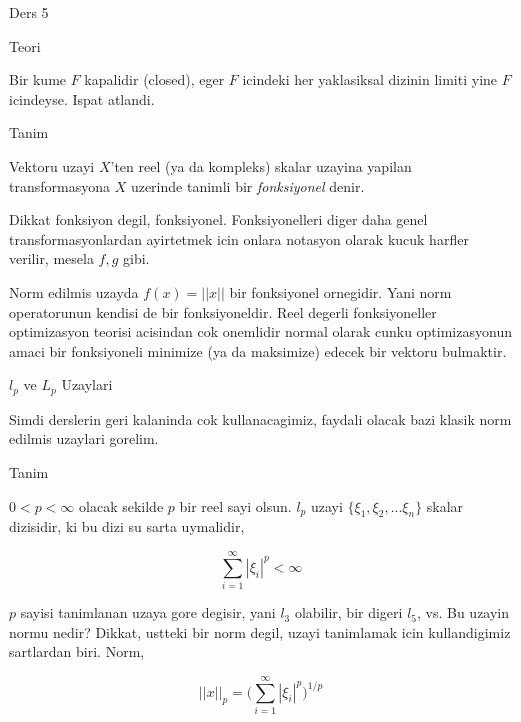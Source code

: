 \documentclass[12pt,fleqn]{article}\usepackage{../common}
\begin{document}
Ders 5

Teori 

Bir kume $F$ kapalidir (closed), eger $F$ icindeki her yaklasiksal dizinin
limiti yine $F$ icindeyse. Ispat atlandi. 

Tanim 

Vektoru uzayi $X$'ten reel (ya da kompleks) skalar uzayina yapilan
transformasyona $X$ uzerinde tanimli bir {\em fonksiyonel} denir. 

Dikkat fonksiyon degil, fonksiyonel. Fonksiyonelleri diger daha genel
transformasyonlardan ayirtetmek icin onlara notasyon olarak kucuk harfler
verilir, mesela $f,g$ gibi. 

Norm edilmis uzayda $f(x) = ||x||$ bir fonksiyonel ornegidir. Yani norm
operatorunun kendisi de bir fonksiyoneldir. Reel degerli fonksiyoneller
optimizasyon teorisi acisindan cok onemlidir normal olarak cunku
optimizasyonun amaci bir fonksiyoneli minimize (ya da maksimize) edecek bir
vektoru bulmaktir. 

$l_p$ ve $L_p$ Uzaylari 

Simdi derslerin geri kalaninda cok kullanacagimiz, faydali olacak bazi
klasik norm edilmis uzaylari gorelim. 

Tanim 

$0 < p < \infty$ olacak sekilde $p$ bir reel sayi olsun. $l_p$ uzayi $\{
\xi_1,\xi_2,...\xi_n\}$ 
skalar dizisidir, ki bu dizi su sarta uymalidir,

\[ \sum_{i=1}^{\infty} |\xi_i|^p < \infty \]

$p$ sayisi tanimlanan uzaya gore degisir, yani $l_3$ olabilir, bir digeri
$l_5$, vs. Bu uzayin normu nedir? Dikkat, ustteki bir norm degil, uzayi
tanimlamak icin kullandigimiz sartlardan biri. Norm, 

\[ ||x||_p = \bigg( \sum_{i=1}^\infty |\xi_i|^p \bigg)^{1/p}  \]
\end{document}
